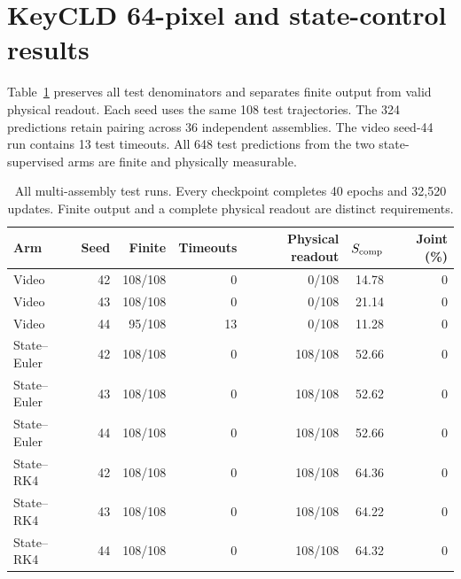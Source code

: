 \section{KeyCLD 64-pixel and state-control results}
\label{app:corpus-results}
Table~\ref{app:corpus-seeds} preserves all test denominators and separates finite output from valid physical readout. Each seed uses the same 108 test trajectories. The 324 predictions retain pairing across 36 independent assemblies. The video seed-44 run contains 13 test timeouts. All 648 test predictions from the two state-supervised arms are finite and physically measurable.

\begin{table}[t]
\caption{All multi-assembly test runs. Every checkpoint completes 40 epochs and 32,520 updates. Finite output and a complete physical readout are distinct requirements.}
\label{app:corpus-seeds}
\centering\small
\begin{tabular}{lrrrrrr}
\toprule
Arm & Seed & Finite & Timeouts & Physical readout & $S_{\rm comp}$ & Joint (\%)\\
\midrule
Video & 42 & 108/108 & 0 & 0/108 & 14.78 & 0 \\
Video & 43 & 108/108 & 0 & 0/108 & 21.14 & 0 \\
Video & 44 & 95/108 & 13 & 0/108 & 11.28 & 0 \\
State--Euler & 42 & 108/108 & 0 & 108/108 & 52.66 & 0 \\
State--Euler & 43 & 108/108 & 0 & 108/108 & 52.62 & 0 \\
State--Euler & 44 & 108/108 & 0 & 108/108 & 52.66 & 0 \\
State--RK4 & 42 & 108/108 & 0 & 108/108 & 64.36 & 0 \\
State--RK4 & 43 & 108/108 & 0 & 108/108 & 64.22 & 0 \\
State--RK4 & 44 & 108/108 & 0 & 108/108 & 64.32 & 0 \\
\bottomrule
\end{tabular}
\end{table}


